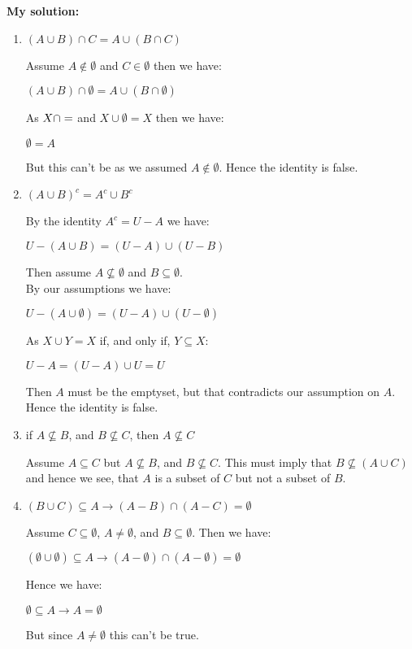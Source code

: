 \documentclass{report}
\newcommand{\cent}[1]{\begin{center}#1\end{center}}
\newcommand{\In}{\! \in \!}
\newcommand{\solution}{\textbf{My solution: }}
\begin{document}
	\solution
	\begin{enumerate}
		\item $ (A \cup B) \cap C = A \cup (B \cap C) $
		
		Assume $A \notin \emptyset$ and $C \In \emptyset$ then we have:
		
		\cent{$ (A \cup B) \cap \emptyset = A \cup (B \cap \emptyset) $}
		
		As $X \cap \empty = \empty$ and $X \cup \emptyset = X$ then we have:
		
		\cent{$ \emptyset = A $}
		
		But this can't be as we assumed $A \notin \emptyset$. Hence the identity is false.
		
		\item $(A \cup B)^c = A^c \cup B^c$
		
		By the identity $ A^c = U-A $ we have:
		
		\cent{$U - (A \cup B) = (U-A) \cup (U-B)$}
		
		Then assume $A \not \subseteq \emptyset$ and $B \subseteq \emptyset$.\\
		
		By our assumptions we have:
		
		\cent{$ U - (A \cup \emptyset) = (U-A) \cup (U-\emptyset) $}
		
		As $X \cup Y = X$ if, and only if, $Y \subseteq X$:
		
		\cent{$ U - A = (U-A) \cup U = U $}
		
		Then $A$ must be the emptyset, but that contradicts our assumption on $A$. Hence the identity is false.
		
		\item if $ A \not \subseteq B $, and $ B \not \subseteq C $, then $ A \not \subseteq C $
		
		Assume $A \subseteq C$ but $A \not \subseteq B$, and $B \not \subseteq C$. This must imply that $B \not \subseteq (A \cup C)$ and hence we see, that $A$ is a subset of $C$ but not a subset of $B$.
		
		\item $ (B \cup C) \subseteq A \to (A-B) \cap (A-C) = \emptyset $
		
		Assume $C \subseteq \emptyset$, $A \neq \emptyset$, and $B \subseteq \emptyset$. Then we have:
		
		\cent{$ (\emptyset \cup \emptyset) \subseteq A \to (A-\emptyset) \cap (A-\emptyset) = \emptyset $}
		
		Hence we have:
		
		\cent{$ \emptyset \subseteq A \to A = \emptyset $}
		
		But since $A \neq \emptyset$ this can't be true.
		
 	\end{enumerate}
 	
\end{document}
